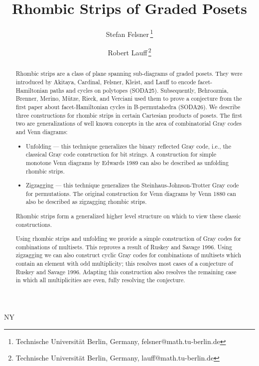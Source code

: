 \documentclass[fontsize=11pt,a4paper,DIV=12]{scrartcl}
\newcommand{\anonymous}{N} %
\begin{document}
\title{\huge Rhombic Strips of Graded Posets}
\if\anonymous Y{
			\author{}
		}\else
	{
		\author{
			Stefan Felsner\,\thanks{Technische Universit\"at Berlin, Germany, felsner@math.tu-berlin.de} \and
			Robert Lauff\,\thanks{Technische Universit\"at Berlin, Germany, lauff@math.tu-berlin.de}
		}
	}
\fi

\date{}

\maketitle
\vspace{-30pt}
\begin{abstract}
	Rhombic strips are a class of plane
	spanning sub-diagrams of graded posets.
	They were introduced by Akitaya, Cardinal, Felsner,
	Kleist, and Lauff to encode facet-Hamiltonian paths and
	cycles on polytopes (SODA25). Subsequently, Behrooznia, Brenner,
	Merino, Mütze, Rieck, and Verciani used them to prove a
	conjecture from the first paper about facet-Hamiltonian
	cycles in B-permutahedra (SODA26). We describe
	three constructions for rhombic strips in certain Cartesian
	products of posets. The first two are generalizations of well
	known concepts in the area of combinatorial Gray codes and Venn diagrams:
	\begin{itemize}
		\item Unfolding --- this technique generalizes the binary reflected Gray code,
		      i.e., the classical Gray code construction for bit strings.
		      A construction for simple monotone Venn diagrams by Edwards 1989
		      can also be described as unfolding rhombic strips.
		\item Zigzagging --- this technique generalizes the Steinhaus-Johnson-Trotter
		      Gray code for permutations. The original construction for Venn diagrams by
		      Venn 1880 can also be described as zigzagging rhombic strips.
	\end{itemize}

	Rhombic strips form a generalized higher
	level structure on which to view these classic constructions.

	Using rhombic strips and unfolding we provide a simple
	construction of Gray codes for combinations
	of multisets. This reproves a result of Ruskey
	and Savage 1996. Using zigzagging we can also
	construct cyclic Gray codes for combinations of
	multisets which contain an element with
	odd multiplicity; this resolves most cases of a conjecture of
	Ruskey and Savage 1996. Adapting this construction also resolves the remaining case in which all multiplicities are even, fully resolving the conjecture.


\end{abstract}
\end{document}
